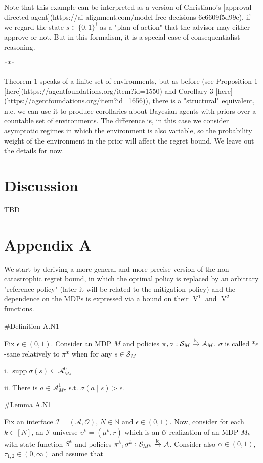 \documentclass[a4paper]{article}
\newcommand{\Bool}{\{0,1\}}
\DeclareMathOperator{\Supp}{supp}
\newcommand{\Nats}{\mathbb{N}}
\newcommand{\M}{\xrightarrow{\textnormal{k}}}
\newcommand{\Ob}{\mathcal{O}}
\newcommand{\A}{\mathcal{A}}
\newcommand{\St}{\mathcal{S}}
\newcommand{\In}{\mathcal{I}}
\newcommand{\V}{\operatorname{V}}
\begin{document}
Note that this example can be interpreted as a version of Christiano's [approval-directed agent](https://ai-alignment.com/model-free-decisions-6e6609f5d99e), if we regard the state $s \in \Bool^{i}$ as a "plan of action" that the advisor may either approve or not. But in this formalism, it is a special case of consequentialist reasoning.

***

Theorem 1 speaks of a finite set of environments, but as before (see Proposition 1 [here](https://agentfoundations.org/item?id=1550) and Corollary 3 [here](https://agentfoundations.org/item?id=1656)), there is a "structural" equivalent, n.e. we can use it to produce corollaries about Bayesian agents with priors over a countable set of environments. The difference is, in this case we consider asymptotic regimes in which the environment is also variable, so the probability weight of the environment in the prior will affect the regret bound. We leave out the details for now.

\section{Discussion}

TBD

\section{Appendix A}

We start by deriving a more general and more precise version of the non-catastrophic regret bound, in which the optimal policy is replaced by an arbitrary "reference policy" (later it will be related to the mitigation policy) and the dependence on the MDPs is expressed via a bound on their $\V^1$ and $\V^2$ functions.

\#Definition A.N1

Fix $\epsilon\in(0,1)$. Consider an MDP $M$ and policies $\pi,\sigma: \St_M \M \A_M$. $\sigma$ is called *$\epsilon$-sane relatively to $\pi$* when for any $s \in \St_M$

i. $\Supp{\sigma(s)} \subseteq \A_{M\pi}^0$

ii. There is $a \in \A_{M\pi}^1$ s.t. $\sigma(a \mid s) > \epsilon$.

\#Lemma A.N1

Fix an interface $\In=(\A,\Ob)$, $N \in \Nats$ and $\epsilon \in (0,1)$. Now, consider for each $k \in [N]$, an $\In$-universe $\upsilon^k=(\mu^k,r)$ which is an $\Ob$-realization of an MDP $M_k$ with state function $S^k$ and policies $\pi^k,\sigma^k: \St_{M^k} \M \A$. Consider also $\alpha\in(0,1)$, $\bar{\tau}_{1,2} \in (0,\infty)$ and assume that 
\end{document}
